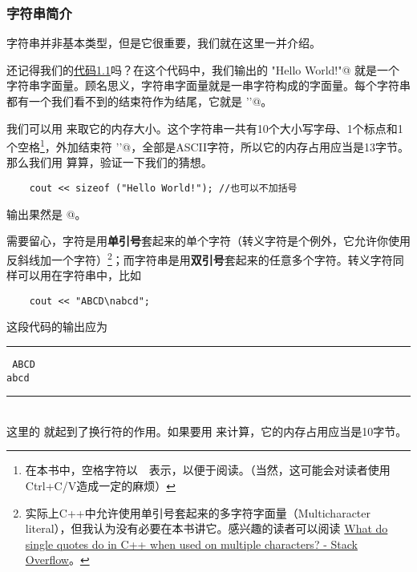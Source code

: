 \subsubsection*{字符串简介}
字符串并非基本类型，但是它很重要，我们就在这里一并介绍。\par
还记得我们的\hyperref[lst:HelloWorld]{代码1.1}吗？在这个代码中，我们输出的 \lstinline@"Hello World!"@ 就是一个字符串字面量。顾名思义，字符串字面量就是一串字符构成的字面量。每个字符串都有一个我们看不到的结束符作为结尾，它就是 \lstinline@'\0'@。\par
我们可以用 \lstinline@sizeof@ 来取它的内存大小。这个字符串一共有10个大小写字母、1个标点和1个空格\footnote{在本书中，空格字符以\ {\color{red}\textvisiblespace}\ 表示，以便于阅读。（当然，这可能会对读者使用Ctrl+C/V造成一定的麻烦）}，外加结束符 \lstinline@'\0'@，全部是ASCII字符，所以它的内存占用应当是13字节。
那么我们用 \lstinline@sizeof@ 算算，验证一下我们的猜想。
\begin{lstlisting}
    cout << sizeof ("Hello World!"); //也可以不加括号
\end{lstlisting}
输出果然是 @。\par
需要留心，字符是用\textbf{单引号}套起来的单个字符（转义字符是个例外，它允许你使用反斜线加一个字符）\footnote{实际上C++中允许使用单引号套起来的多字符字面量（Multicharacter literal），但我认为没有必要在本书讲它。感兴趣的读者可以阅读 \href{https://stackoverflow.com/questions/7459939/what-do-single-quotes-do-in-c-when-used-on-multiple-characters}{What do single quotes do in C++ when used on multiple characters? - Stack Overflow}。}；而字符串是用\textbf{双引号}套起来的任意多个字符。转义字符同样可以用在字符串中，比如
\begin{lstlisting}
    cout << "ABCD\nabcd";
\end{lstlisting}
这段代码的输出应为\\\noindent\rule{\textwidth}{0.2pt}\texttt{
ABCD\\
abcd
}\\\noindent\rule{\textwidth}{0.2pt}\\
这里的 \lstinline@\n@ 就起到了换行符的作用。如果要用 \lstinline@sizeof@ 来计算，它的内存占用应当是10字节。\par
